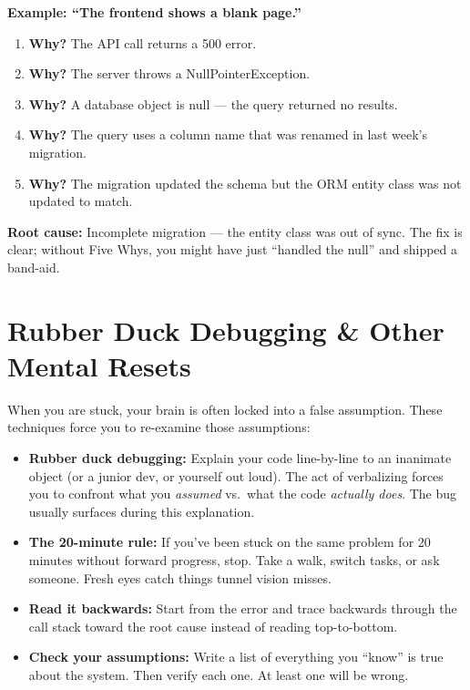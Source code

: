 \documentclass[11pt, letterpaper]{article}
\begin{document}
\begin{tcolorbox}[colback=part3bg, colframe=sectionpurple, arc=3pt, boxrule=1pt]
\textbf{Example: ``The frontend shows a blank page.''}
\begin{enumerate}[noitemsep, leftmargin=*]
  \item \textbf{Why?} The API call returns a 500 error.
  \item \textbf{Why?} The server throws a NullPointerException.
  \item \textbf{Why?} A database object is null --- the query returned no results.
  \item \textbf{Why?} The query uses a column name that was renamed in last week's migration.
  \item \textbf{Why?} The migration updated the schema but the ORM entity class was not updated to match.
\end{enumerate}
\textbf{Root cause:} Incomplete migration --- the entity class was out of sync. The fix is clear; without Five Whys, you might have just ``handled the null'' and shipped a band-aid.
\end{tcolorbox}

\section*{Rubber Duck Debugging \& Other Mental Resets}

When you are stuck, your brain is often locked into a false assumption. These techniques force you to re-examine those assumptions:

\begin{itemize}[noitemsep]
  \item \textbf{Rubber duck debugging:} Explain your code line-by-line to an inanimate object (or a junior dev, or yourself out loud). The act of verbalizing forces you to confront what you \emph{assumed} vs.\ what the code \emph{actually does}. The bug usually surfaces during this explanation.
  \item \textbf{The 20-minute rule:} If you've been stuck on the same problem for 20 minutes without forward progress, stop. Take a walk, switch tasks, or ask someone. Fresh eyes catch things tunnel vision misses.
  \item \textbf{Read it backwards:} Start from the error and trace backwards through the call stack toward the root cause instead of reading top-to-bottom.
  \item \textbf{Check your assumptions:} Write a list of everything you ``know'' is true about the system. Then verify each one. At least one will be wrong.
\end{itemize}
\end{document}
